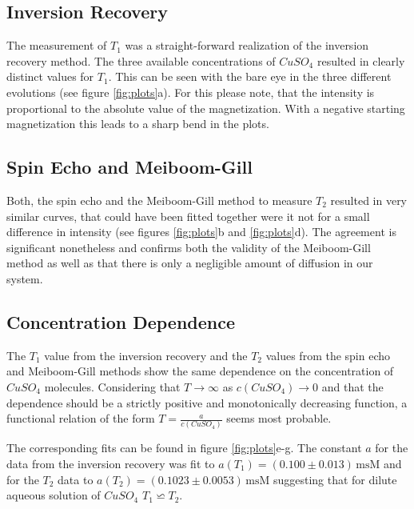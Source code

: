 \documentclass[a4paper]{scrartcl}
\numberwithin{equation}{section}
\numberwithin{figure}{section}
\numberwithin{table}{section}
\begin{document}
\subsection{Inversion Recovery}
The measurement of $T_1$ was a straight-forward realization of the inversion recovery method. The three available concentrations of $CuSO_4$ resulted in clearly distinct values for $T_1$. This can be seen with the bare eye in the three different evolutions (see figure \ref{fig:plots}a). For this please note, that the intensity is proportional to the absolute value of the magnetization. With a negative starting magnetization this leads to a sharp bend in the plots.

\subsection{Spin Echo and Meiboom-Gill}
Both, the spin echo and the Meiboom-Gill method to measure $T_2$ resulted in very similar curves, that could have been fitted together were it not for a small difference in intensity (see figures \ref{fig:plots}b and \ref{fig:plots}d). The agreement is significant nonetheless and confirms both the validity of the Meiboom-Gill method as well as that there is only a negligible amount of diffusion in our system.

\subsection{Concentration Dependence}
The $T_1$ value from the inversion recovery and the $T_2$ values from the spin echo and Meiboom-Gill methods show the same dependence on the concentration of $CuSO_4$ molecules. Considering that $T\rightarrow\infty$ as $c(CuSO_4)\rightarrow 0$ and that the dependence should be a strictly positive and monotonically decreasing function, a functional relation of the form $T=\frac{a}{c(CuSO_4)}$ seems most probable.

The corresponding fits can be found in figure \ref{fig:plots}e-g. The constant $a$ for the data from the inversion recovery was fit to $a(T_1)=(0.100\pm 0.013)\,\text{msM}$ and for the $T_2$ data to $a(T_2)=(0.1023\pm 0.0053)\,\text{msM}$ suggesting that for dilute aqueous solution of $CuSO_4$ $T_1\backsimeq T_2$.
\end{document}
